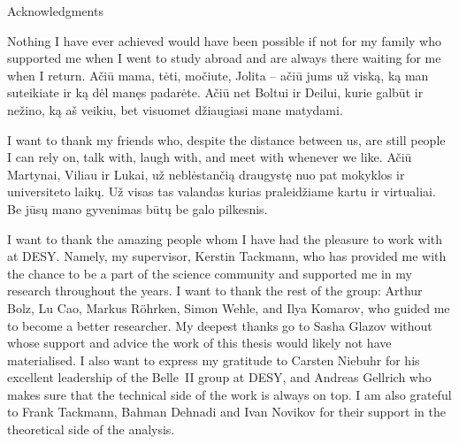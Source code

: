\begin{abstractpage}{Acknowledgments}
    Nothing I have ever achieved would have been possible if not for my family who supported me
    when I went to study abroad and are always there waiting for me when I return.
    Ačiū mama, tėti, močiute, Jolita -- ačiū jums už viską, ką man suteikiate ir ką dėl manęs padarėte.
    Ačiū net Boltui ir Deilui, kurie galbūt ir nežino, ką aš veikiu, bet visuomet džiaugiasi mane matydami.

    I want to thank my friends who, despite the distance between us, are still people I can rely on, talk with,
    laugh with, and meet with whenever we like.
    Ačiū Martynai, Viliau ir Lukai, už neblėstančią draugystę nuo pat mokyklos ir universiteto laikų.
    Už visas tas valandas kurias praleidžiame kartu ir virtualiai.
    Be jūsų mano gyvenimas būtų be galo pilkesnis.

    I want to thank the amazing people whom I have had the pleasure to work with at DESY.
    Namely, my supervisor, Kerstin Tackmann, who has provided me with the chance to be a part of the science community
    and supported me in my research throughout the years.
    I want to thank the rest of the group: Arthur Bolz, Lu Cao, Markus R\"ohrken, Simon Wehle, and Ilya Komarov, who guided me to become a better researcher.
    My deepest thanks go to Sasha Glazov without whose support and advice the work of this thesis would likely not have materialised.
    I also want to express my gratitude to Carsten Niebuhr for his excellent leadership of the Belle~II group at DESY,
    and Andreas Gellrich who makes sure that the technical side of the work is always on top.
    I am also grateful to Frank Tackmann, Bahman Dehnadi and Ivan Novikov for their support in the theoretical side of the analysis.


\end{abstractpage}

